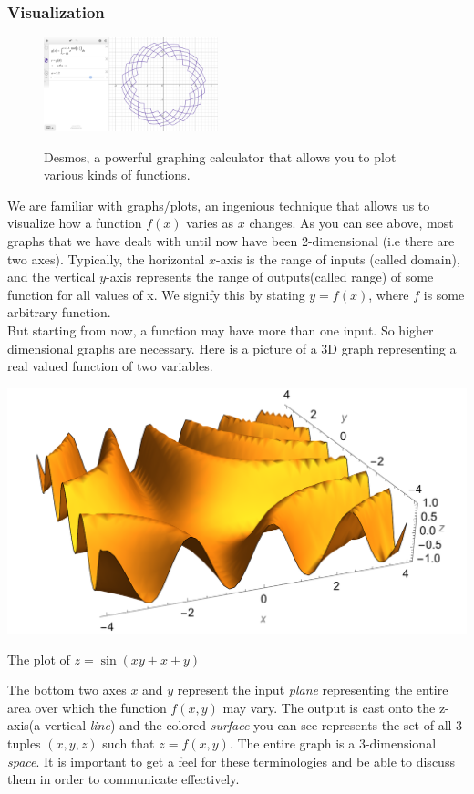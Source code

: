 \documentclass[14pt]{article}
\begin{document}
	\subsubsection{Visualization}
	\begin{figure}
		\centering
		\includegraphics[width=0.45\textwidth]{desmos_advertisement_lol}
		
		\footnotesize \raggedright Desmos, a powerful graphing calculator that allows you to plot various kinds of functions.
	\end{figure}
	We are familiar with graphs/plots, an ingenious technique that allows us to visualize how a function $f(x)$ varies as $x$ changes. As you can see above, most graphs that we have dealt with until now have been 2-dimensional (i.e there are two axes). Typically, the horizontal $x$-axis is the range of inputs (called domain), and the vertical $y$-axis represents the range of outputs(called range) of some function for all values of x. We signify this by stating $y = f(x)$, where $f$ is some arbitrary function.\\[1em]
	But starting from now, a function may have more than one input. So higher dimensional graphs are necessary. Here is a picture of a 3D graph representing a real valued function of two variables. 
	\begin{center}
		\includegraphics[width=15cm]{3d-graph_1}
		
		\footnotesize The plot of $z = \sin(xy + x + y)$
	\end{center}
	The bottom two axes $x$ and $y$ represent the input \textit{plane} representing the entire area over which the function $f(x, y)$ may vary. The output is cast onto the z-axis(a vertical \textit{line}) and the colored \textit{surface} you can see represents the set of all 3-tuples $(x,y,z)$ such that $z = f(x, y)$. The entire graph is a 3-dimensional \textit{space}. It is important to get a feel for these terminologies and be able to discuss them in order to communicate effectively. 
	
\end{document}
